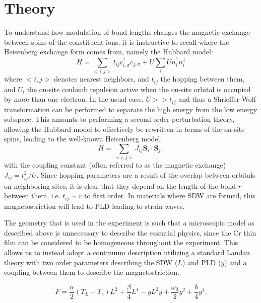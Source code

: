 \section{Theory}

To understand how modulation of bond lengths changes the magnetic exchange between spins of the constituent ions, it is instructive to recall where the Heisenberg exchange form comes from, namely the Hubbard model:
\begin{equation}
	H = \sum_{<i,j>}t_{ij} c_{i,\sigma}^{\dag} c_{j,\sigma}  +  U \sum_i U n_i^{\uparrow} n_i^{\downarrow}
\end{equation}
where $<i,j>$ denotes nearest neighbors, and $t_{ij}$ the hopping between them, and $U_i$ the on-site coulomb repulsion active when the on-site orbital is occupied by more than one electron. 
In the usual case, $U >> t_{ij}$ and thus a Shrieffer-Wolf transformation can be performed to separate the high energy from the low energy subspace. This amounts to performing a second order perturbation theory, allowing the Hubbard model to effectively be rewritten in terms of the on-site spins, leading to the well-known Heisenberg model:
\begin{equation}
	\label{eq:Heisenberg}
	H = \sum_{<i,j>}J_{ij} \mathbf{S}_i \cdot \mathbf{S}_j,
\end{equation}
with the coupling constant (often referred to as the magnetic exchange) $J_{ij}=t_{ij}^2/U$. Since hopping parameters are a result of the overlap between orbitals on neighboring sites, it is clear that they depend on the length of the bond $r$ between them, i.e. $t_{ij} \sim r$ to first order. 
In materials where SDW are formed, this magnetostriction will lead to PLD leading to strain waves. 

The geometry that is used in the experiment is such that a microscopic model as described above is unnecessary to describe the essential physics, since the Cr thin film can be considered to be homogeneous throughout the experiment. This allows us to instead adopt a continuum description utilizing a standard Landau theory with two order parameters describing the SDW ($L$) and PLD ($y$) and a coupling between them to describe the magnetostriction.  

\begin{equation}
	\label{eq:Cr_landau}
	F = \frac{\alpha}{2}(T_L-T_c) L^2 + \frac{\beta}{4} L^4 - g L^2 y + \frac{\omega_0}{2} y^2 + \frac{b}{4} y^4.
\end{equation}

